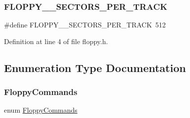 \subsubsection{\texorpdfstring{F\+L\+O\+P\+P\+Y\+\_\+\_\+\+S\+E\+C\+T\+O\+R\+S\+\_\+\+P\+E\+R\+\_\+\+T\+R\+A\+CK}{FLOPPY\_144\_SECTORS\_PER\_TRACK}}
{\footnotesize\ttfamily \#define F\+L\+O\+P\+P\+Y\+\_\+\_\+\+S\+E\+C\+T\+O\+R\+S\+\_\+\+P\+E\+R\+\_\+\+T\+R\+A\+CK~512}



Definition at line 4 of file floppy.\+h.



\subsection{Enumeration Type Documentation}
\mbox{\label{a00017_a9990a5de334fdaec2ce93b74b8676148_a9990a5de334fdaec2ce93b74b8676148}} 
\subsubsection{\texorpdfstring{Floppy\+Commands}{FloppyCommands}}
{\footnotesize\ttfamily enum \hyperlink{a00017_a9990a5de334fdaec2ce93b74b8676148_a9990a5de334fdaec2ce93b74b8676148}{Floppy\+Commands}}

